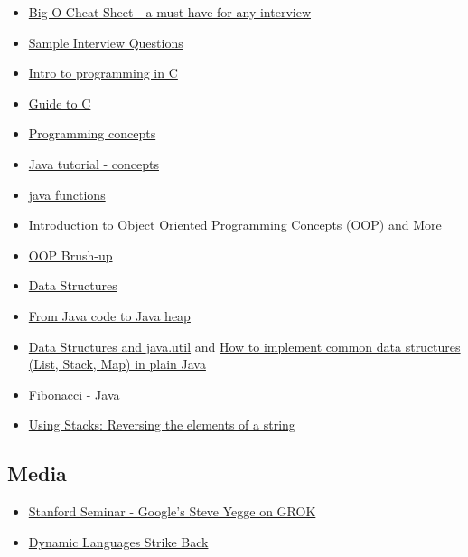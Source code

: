 \documentclass[letterpaper]{article}
\begin{document}
\begin{itemize}
\item \href{http://bigocheatsheet.com}{Big-O Cheat Sheet - a must have for any interview}
\item \href{http://kundansingh.com/interview/#h1}{Sample Interview Questions}
\item \href{http://www.cprogramming.com/tutorial/c/lesson1.html}{Intro to programming in C}
\item \href{http://www.acm.uiuc.edu/webmonkeys/book/c_guide/1.2.html}{Guide to C}
\item \href{http://www.ncl.ucar.edu/Document/HLUs/User_Guide/classes/classoview.shtml}{Programming concepts}
\item \href{http://docs.oracle.com/javase/tutorial/java/concepts/}{Java tutorial - concepts}
\item \href{http://introcs.cs.princeton.edu/java/21function/}{java functions}
\item \href{http://www.codeproject.com/Articles/22769/Introduction-to-Object-Oriented-Programming-Concep}{Introduction to Object Oriented Programming Concepts (OOP) and More}
\item \href{http://www.victusspiritus.com/2011/03/15/brushing-up-on-computer-science-part-2-object-oriented-programming-oop/}{OOP Brush-up} 
\item \href{http://www.seas.gwu.edu/~drum/cs1112/lectures/module8/module8.html}
	  {Data Structures}
\item \href{http://www.ibm.com/developerworks/library/j-codetoheap/}
	  {From Java code to Java heap}
\item \href{http://www.cafeaulait.org/books/jdr/examples/21/}{Data Structures and java.util} 
and \href{http://www.vogella.com/articles/JavaDatastructures/article.html}{How to implement common data structures (List, Stack, Map) in plain Java}
\item \href{http://introcs.cs.princeton.edu/java/92symbolic/Fibonacci.java.html}
	  {Fibonacci - Java}
\item \href{http://www.tutorialspoint.com/javaexamples/data_reverse.htm}
	  {Using Stacks: Reversing the elements of a string} 
\end{itemize} 
 
\subsection{Media}
 \begin{itemize}
 \item \href{http://www.youtube.com/watch?v=KTJs-0EInW8}{Stanford Seminar - Google's Steve Yegge on GROK}
 \item \href{http://www.youtube.com/watch?v=tz-Bb-D6teE}{Dynamic Languages Strike Back} 
 \end{itemize}
\end{document}
